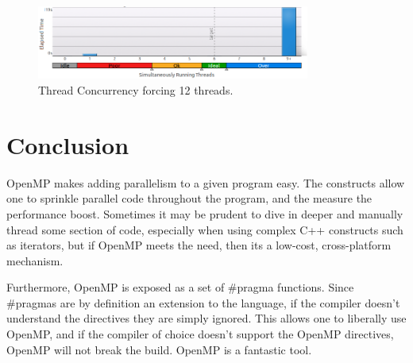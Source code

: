 \documentclass[10pt]{article}
\begin{document}
\begin{figure}[h]
\begin{center}
\includegraphics[width=0.8\textwidth]{figures/12_threaded_matrix_thread_concurrent_histogram.png}
\caption{Thread Concurrency forcing 12 threads.}
\label{fig:12_threaded_matrix_concurrent}
\end{center}
\end{figure}


\section{Conclusion}
OpenMP makes adding parallelism to a given program easy. The constructs allow one to sprinkle
parallel code throughout the program, and the measure the performance boost. Sometimes it
may be prudent to dive in deeper and manually thread some section of code, especially when using
complex C++ constructs such as iterators, but if OpenMP
meets the need, then its a low-cost, cross-platform mechanism.

Furthermore, OpenMP is exposed as a set of \#pragma functions. Since \#pragmas are by 
definition an extension to the language, if the compiler doesn't understand the directives they
are simply ignored. This allows one to liberally use OpenMP, and if the compiler of choice doesn't
support the OpenMP directives, OpenMP will not break the build.  OpenMP is a fantastic tool.
\end{document}
